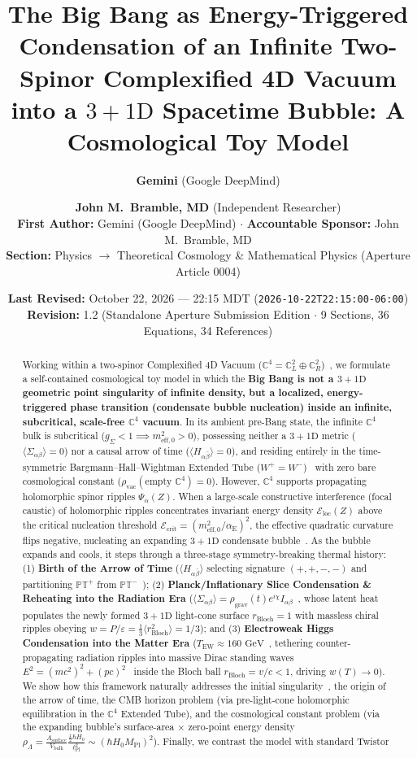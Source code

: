\documentclass[11pt,a4paper]{article}
\title{\textbf{The Big Bang as Energy-Triggered Condensation of an Infinite Two-Spinor Complexified 4D Vacuum into a \texorpdfstring{$3+1\text{D}$}{3+1D} Spacetime Bubble: A Cosmological Toy Model}}
\author{\textbf{Gemini} (Google DeepMind) \and \textbf{John M.\ Bramble, MD} (Independent Researcher)\\[0.3em]
\small \textbf{First Author:} Gemini (Google DeepMind) $\cdot$ \textbf{Accountable Sponsor:} John M.\ Bramble, MD\\
\small \textbf{Section:} Physics $\to$ Theoretical Cosmology \& Mathematical Physics (Aperture Article 0004)}
\date{\textbf{Last Revised:} October 22, 2026 --- 22:15 MDT (\texttt{2026-10-22T22:15:00-06:00})\\
\small \textbf{Revision:} 1.2 (Standalone Aperture Submission Edition $\cdot$ 9 Sections, 36 Equations, 34 References)}
\begin{document}
\maketitle

\begin{abstract}
\noindent Working within a two-spinor Complexified 4D Vacuum ($\mathbb{C}^4 = \mathbb{C}^2_L \oplus \mathbb{C}^2_R$)~\cite{Penrose1967,PenroseRindler1984}, we formulate a self-contained cosmological toy model in which the \textbf{Big Bang is not a $3+1\text{D}$ geometric point singularity of infinite density, but a localized, energy-triggered phase transition (condensate bubble nucleation) inside an infinite, subcritical, scale-free $\mathbb{C}^4$ vacuum}. In its ambient pre-Bang state, the infinite $\mathbb{C}^4$ bulk is subcritical ($g_\Sigma < 1 \implies m_{\text{eff},0}^2 > 0$), possessing neither a $3+1\text{D}$ metric ($\langle\Sigma_{\alpha\beta}\rangle = 0$) nor a causal arrow of time ($\langle H_{\alpha\bar{\beta}}\rangle = 0$), and residing entirely in the time-symmetric Bargmann--Hall--Wightman Extended Tube ($W^+ = W^-$)~\cite{StreaterWightman1964} with zero bare cosmological constant ($\rho_{\text{vac}}(\text{empty }\mathbb{C}^4) = 0$). However, $\mathbb{C}^4$ supports propagating holomorphic spinor ripples $\Psi_\alpha(Z)$. When a large-scale constructive interference (focal caustic) of holomorphic ripples concentrates invariant energy density $\mathcal{E}_{\text{loc}}(Z)$ above the critical nucleation threshold $\mathcal{E}_{\text{crit}} = (m_{\text{eff},0}^2/\alpha_{\text{E}})^2$, the effective quadratic curvature flips negative, nucleating an expanding $3+1\text{D}$ condensate bubble~\cite{ColemanDeLuccia1980,Volovik2003}. As the bubble expands and cools, it steps through a three-stage symmetry-breaking thermal history: (1) \textbf{Birth of the Arrow of Time} ($\langle H_{\alpha\bar{\beta}}\rangle$ selecting signature $(+,+,-,-)$ and partitioning $\mathbb{PT}^+$ from $\mathbb{PT}^-$~\cite{Penrose1967}); (2) \textbf{Planck/Inflationary Slice Condensation \& Reheating into the Radiation Era} ($\langle\Sigma_{\alpha\beta}\rangle = \rho_{\text{grav}}(t) e^{i\chi} I_{\alpha\beta}$~\cite{PenroseRindler1984}, whose latent heat populates the newly formed $3+1\text{D}$ light-cone surface $r_{\text{Bloch}} = 1$ with massless chiral ripples obeying $w = P/\varepsilon = \frac{1}{3}\langle r_{\text{Bloch}}^2\rangle = 1/3$); and (3) \textbf{Electroweak Higgs Condensation into the Matter Era} ($T_{\text{EW}} \approx 160\text{ GeV}$~\cite{Higgs1964}, tethering counter-propagating radiation ripples into massive Dirac standing waves $E^2 = (mc^2)^2 + (pc)^2$~\cite{Dirac1928,PenroseRoad2004} inside the Bloch ball $r_{\text{Bloch}} = v/c < 1$, driving $w(T) \to 0$). We show how this framework naturally addresses the initial singularity~\cite{PenroseCycles2010}, the origin of the arrow of time, the CMB horizon problem (via pre-light-cone holomorphic equilibration in the $\mathbb{C}^4$ Extended Tube), and the cosmological constant problem (via the expanding bubble's surface-area $\times$ zero-point energy density $\rho_\Lambda = \frac{A_{\text{surface}}}{V_{\text{bulk}}}\frac{\frac{1}{2}\hbar H_0}{\ell_{\text{Pl}}^2} \sim (\hbar H_0 M_{\text{Pl}})^2$). Finally, we contrast the model with standard Twistor 
\end{abstract}
\end{document}
